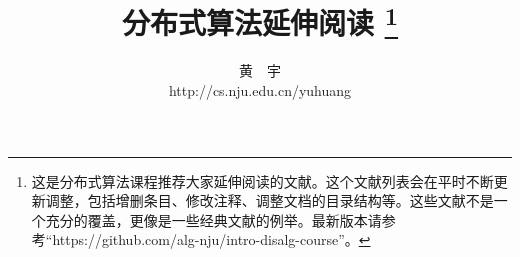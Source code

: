 \documentclass[UTF8]{ctexrep}
\theoremstyle{nonumber}
\begin{document}
\title{\bf \huge 分布式算法延伸阅读 \footnote{这是分布式算法课程推荐大家延伸阅读的文献。这个文献列表会在平时不断更新调整，包括增删条目、修改注释、调整文档的目录结构等。这些文献不是一个充分的覆盖，更像是一些经典文献的例举。最新版本请参考“https://github.com/alg-nju/intro-disalg-course”。}}

\author{黄\ \ 宇 \\ http://cs.nju.edu.cn/yuhuang}

\date{}
\maketitle

\tableofcontents


 

 

 

 

 

 


%


\end{document}
